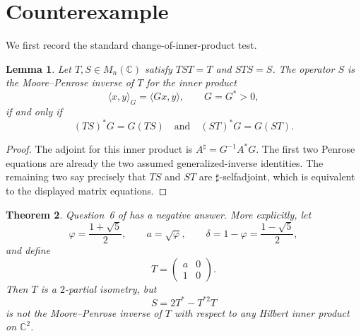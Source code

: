 \documentclass[11pt]{article}
\newtheorem{theorem}{Theorem}
\newtheorem{lemma}[theorem]{Lemma}
\newcommand{\C}{\mathbb C}
\begin{document}
\section{Counterexample}

We first record the standard change-of-inner-product test.

\begin{lemma}\label{lem:test}
Let $T,S\in M_n(\C)$ satisfy $TST=T$ and $STS=S$.  The operator $S$ is the
Moore--Penrose inverse of $T$ for the inner product
\[
 \langle x,y\rangle_G=\langle Gx,y\rangle,
 \qquad G=G^*>0,
\]
if and only if
\[
 (TS)^*G=G(TS)
 \quad\text{and}\quad
 (ST)^*G=G(ST).
\]
\end{lemma}

\begin{proof}
The adjoint for this inner product is $A^{\sharp}=G^{-1}A^*G$.  The first two
Penrose equations are already the two assumed generalized-inverse identities.
The remaining two say precisely that $TS$ and $ST$ are
$\sharp$-selfadjoint, which is equivalent to the displayed matrix equations.
\end{proof}

\begin{theorem}\label{thm:main}
Question~6 of \cite{ABG} has a negative answer.  More explicitly, let
\[
 \varphi=\frac{1+\sqrt5}{2},\qquad
 a=\sqrt\varphi,\qquad
 \delta=1-\varphi=\frac{1-\sqrt5}{2},
\]
and define
\[
 T=\begin{pmatrix}a&0\\1&0\end{pmatrix}.
\]
Then $T$ is a $2$-partial isometry, but
\[
 S=2T^*-T^{*2}T
\]
is not the Moore--Penrose inverse of $T$ with respect to any Hilbert inner
product on $\C^2$.
\end{theorem}
\end{document}
